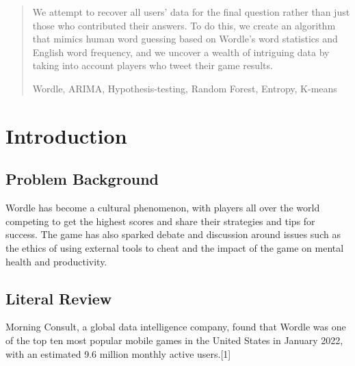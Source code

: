 \documentclass{mcmthesis}
\begin{document}
\begin{abstract}
We attempt to recover all users' data for the final question rather than just those who contributed their answers. To do this, we create an algorithm that mimics human word guessing based on Wordle's word statistics and English word frequency, and we uncover a wealth of intriguing data by taking into account players who tweet their game results.

\begin{keywords}
Wordle, ARIMA, Hypothesis-testing, Random Forest, Entropy, K-means
\end{keywords}
\end{abstract}
\maketitle

\begin{spacing}
\tableofcontents 
\end{spacing}
\newpage


\section{Introduction}
\subsection{Problem Background}

\hspace*{0.6cm} Wordle has become a cultural phenomenon, with players all over the world competing to get the highest scores and share their strategies and tips for success. The game has also sparked debate and discussion around issues such as the ethics of using external tools to cheat and the impact of the game on mental health and productivity.

\subsection{Literal Review}

\hspace*{0.6cm}Morning Consult, a global data intelligence company, found that Wordle was one of the top ten most popular mobile games in the United States in January 2022, with an estimated 9.6 million monthly active users.[1]
\end{document}

